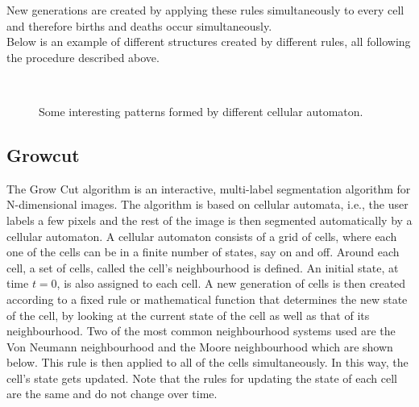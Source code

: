 \documentclass[a4paper,10pt]{article}
\begin{document}
New generations are created by applying these rules simultaneously to every cell and therefore births and deaths occur simultaneously. \\

Below is an example of different structures created by different rules, all following the procedure described above.

\begin{figure}[H]
\centering
\mbox{ \quad
{}} 
\caption{Some interesting patterns formed by different cellular automaton.}
\end{figure}

\subsection{Growcut}
\label{growcut}
The Grow Cut algorithm is an interactive, multi-label segmentation algorithm
for N-dimensional images.  The algorithm is based on cellular automata, i.e.,
the user labels a few pixels and the rest of the image is then segmented
automatically by a cellular automaton.  A cellular automaton consists of a
grid of cells, where each one of the cells can be in a finite number of
states, say on and off.   Around each cell, a set of cells, called the cell's
neighbourhood is defined.  An initial state, at time $t = 0$, is also assigned
to each cell.
A new generation of cells is then created according to a fixed rule or
mathematical function that determines the new state of the cell, by looking at
the current state of the cell as well
as that of its neighbourhood.  Two of the most common neighbourhood systems used are the Von
Neumann neighbourhood and the Moore neighbourhood which are shown below.
This rule
is then applied to all of the cells simultaneously.  In this way, the cell's
state gets updated.  Note that the rules for updating the state of each cell are
the same and do not
change over time. \\
\end{document}
